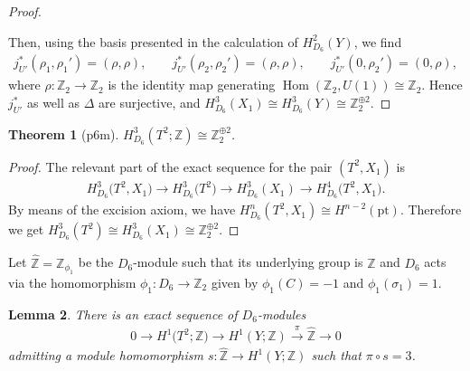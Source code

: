 \documentclass[pdftex]{sigma}
\newtheorem{thm}{Theorem}[section]
\newtheorem{lem}[thm]{Lemma}
\theoremstyle{definition}
\newcommand{\Z}{\mathbb{Z}}
\newcommand{\pt}{\mathrm{pt}}
\begin{document}
\begin{proof}
\begin{itemize}
\end{itemize}
Then, using the basis presented in the calculation of $H^2_{D_6}(Y)$, we f\/ind
\begin{gather*}
j_{U'}^*(\rho_1, \rho_1') = (\rho, \rho), \qquad j_{U'}^*(\rho_2, \rho_2') = (\rho, \rho), \qquad
j_{U'}^*(0, \rho_2') = (0, \rho),
\end{gather*}
where $\rho\colon \Z_2 \to \Z_2$ is the identity map generating $\operatorname{Hom}(\Z_2, U(1)) \cong \Z_2$. Hence $j_{U'}^*$ as well as $\Delta$ are surjective, and $H^3_{D_6}(X_1) \cong H^3_{D_6}(Y) \cong \Z_2^{\oplus 2}$.
\end{proof}

\begin{thm}[\textsf{p6m}]
$H^3_{D_6}(T^2; \Z) \cong \Z_2^{\oplus 2}$.
\end{thm}

\begin{proof}
The relevant part of the exact sequence for the pair $(T^2, X_1)$ is
\begin{gather*}
H^3_{D_6}\big(T^2, X_1\big) \to H^3_{D_6}\big(T^2\big) \to H^3_{D_6}(X_1) \to H^4_{D_6}\big(T^2, X_1\big).
\end{gather*}
By means of the excision axiom, we have $H^n_{D_6}(T^2, X_1) \cong H^{n-2}(\pt)$. Therefore we get $H^3_{D_6}(T^2) \cong H^3_{D_6}(X_1) \cong \Z_2^{\oplus 2}$.
\end{proof}

Let $\hat{\Z} = \Z_{\phi_1}$ be the $D_6$-module such that its underlying group is $\Z$ and $D_6$ acts via the homomorphism $\phi_1\colon D_6 \to \Z_2$ given by $\phi_1(C) = -1$ and $\phi_1(\sigma_1) = 1$.

\begin{lem} \label{lem:p6m_short_exact_sequence_of_modules}
There is an exact sequence of $D_6$-modules
\begin{gather*}
0 \to H^1\big(T^2; \Z\big) \to H^1(Y; \Z) \overset{\pi}{\to} \hat{\Z} \to 0
\end{gather*}
admitting a module homomorphism $s\colon \hat{\Z} \to H^1(Y; \Z)$ such that $\pi \circ s = 3$.
\end{lem}
\end{document}
